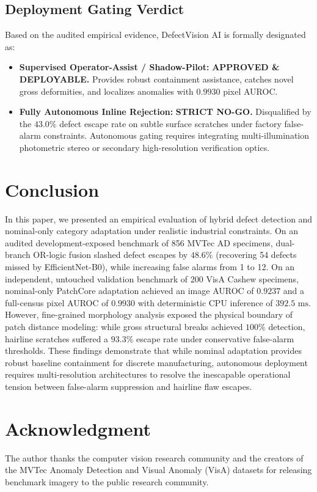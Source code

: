 \documentclass[journal]{IEEEtran}
\begin{document}
\subsection{Deployment Gating Verdict}
Based on the audited empirical evidence, DefectVision AI is formally designated as:
\begin{itemize}
    \item \textbf{Supervised Operator-Assist / Shadow-Pilot:} \textbf{APPROVED \& DEPLOYABLE.} Provides robust containment assistance, catches novel gross deformities, and localizes anomalies with $0.9930$ pixel AUROC.
    \item \textbf{Fully Autonomous Inline Rejection:} \textbf{STRICT NO-GO.} Disqualified by the $43.0\%$ defect escape rate on subtle surface scratches under factory false-alarm constraints. Autonomous gating requires integrating multi-illumination photometric stereo or secondary high-resolution verification optics.
\end{itemize}

\section{Conclusion}
In this paper, we presented an empirical evaluation of hybrid defect detection and nominal-only category adaptation under realistic industrial constraints. On an audited development-exposed benchmark of 856 MVTec AD specimens, dual-branch OR-logic fusion slashed defect escapes by $48.6\%$ (recovering 54 defects missed by EfficientNet-B0), while increasing false alarms from 1 to 12. On an independent, untouched validation benchmark of 200 VisA Cashew specimens, nominal-only PatchCore adaptation achieved an image AUROC of $0.9237$ and a full-census pixel AUROC of $0.9930$ with deterministic CPU inference of $392.5\text{ ms}$. However, fine-grained morphology analysis exposed the physical boundary of patch distance modeling: while gross structural breaks achieved $100\%$ detection, hairline scratches suffered a $93.3\%$ escape rate under conservative false-alarm thresholds. These findings demonstrate that while nominal adaptation provides robust baseline containment for discrete manufacturing, autonomous deployment requires multi-resolution architectures to resolve the inescapable operational tension between false-alarm suppression and hairline flaw escapes.

\section*{Acknowledgment}
The author thanks the computer vision research community and the creators of the MVTec Anomaly Detection and Visual Anomaly (VisA) datasets for releasing benchmark imagery to the public research community.



\end{document}
